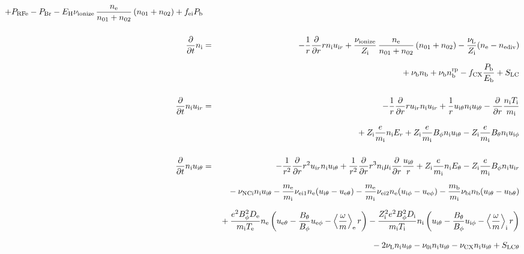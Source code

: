\documentclass[11pt]{article}
\def\r#1{{\rm#1}}
\def\ddt{\frac{\partial}{\partial t}}
\def\ddr{\frac{\partial}{\partial r}}
\def\ave#1{\left\langle#1\right\rangle}
\def\me{m_\r{e}}
\def\mi{m_\r{i}}
\def\mb{m_\r{b}}
\def\mue{\mu_\r{e}}
\def\mui{\mu_\r{i}}
\def\De{D_\r{e}}
\def\Di{D_\r{i}}
\def\ne{n_\r{e}}
\def\ni{n_\r{i}}
\def\nb{n_\r{b}}
\def\uir{u_{\r{i}r}}
\def\ueth{u_{\r{e}\theta}}
\def\uith{u_{\r{i}\theta}}
\def\ubth{u_{\r{b}\theta}}
\def\ueph{u_{\r{e}\phi}}
\def\uiph{u_{\r{i}\phi}}
\def\Er{E_r}
\def\Eth{E_\theta}
\def\Bth{B_\theta}
\def\Bph{B_\phi}
\def\Te{T_\r{e}}
\def\Ti{T_\r{i}}
\def\nna{n_{01}}
\def\nnb{n_{02}}
\def\Zi{Z_\r{i}}
\def\Pb{P_\r{b}}
\def\Eb{E_\r{b}}
\def\PRFe{P_\r{RFe}}
\def\PBr{P_\r{Br}}
\def\EH{E_\r{H}}
\def\fei{f_\r{ei}}
\def\nbrp{n_\r{b}^\r{rp}}
\def\fCX{f_\r{CX}}
\def\nuNCi{\nu_\r{NCi}}
\def\nubi{\nu_\r{bi}}
\def\nuni{\nu_\r{0i}}
\def\nuL{\nu_\r{L}}
\def\nuCX{\nu_\r{CX}}
\def\nuion{\nu_\r{ionize}}
\def\nub{\nu_\r{b}}
\def\nediv{n_\r{ediv}}
\newcommand{\Frac}[2]{%
  {\displaystyle {\displaystyle #1\over \displaystyle #2}}%
}
\newcommand{\rdprd}[2]{\Frac{\partial #1}{\partial #2}}
\newcommand{\aveaveB}[1]{\left< \!\! \left< #1 \right> \!\! \right>}
\begin{document}
\begin{eqnarray}
%
  + \PRFe
%
  - \PBr
%
  - \EH \nuion\, \frac{\ne}{\nna+\nnb}\, (\nna+\nnb)
%
  + \fei \Pb
\\[5mm]
%
%
  \ddt\ni &=&
%
  - \frac{1}{r} \ddr r \ni \uir
%
  + \frac{\nuion}{\Zi}\, \frac{\ne}{\nna+\nnb}\, (\nna+\nnb)
%
  - \frac{\nuL}{\Zi} (\ne - \nediv) 
\nonumber\\[2.5mm]&&{}
%
  + \nub \nb
%
  + \nub \nbrp
%
  - \fCX \frac{\Pb}{\Eb}
%
  + S_\r{LC}
\\[5mm]
%
%
  \ddt \ni \uir &=&
%
  - \frac{1}{r} \ddr r \uir \ni \uir
%
  + \frac{1}{r} \uith \ni \uith
%
  - \ddr \frac{\ni \Ti}{\mi}
\nonumber\\[3mm]&&{}
%
  + \Zi \frac{e}{\mi}\ni \Er
%
  + \Zi \frac{e}{\mi} \Bph \ni \uith
%
  - \Zi \frac{e}{\mi} \Bth \ni \uiph
\\[5mm]
%
%
  \ddt \ni \uith &=&
%
  - \frac{1}{r^2} \ddr r^2 \uir \ni \uith
%
  + \frac{1}{r^2} \ddr r^3 \ni \mui \ddr \frac{\uith}{r}
%
  + \Zi \frac{e}{\mi} \ni \Eth
%
  - \Zi \frac{e}{\mi} \Bph \ni \uir
\nonumber\\[2.5mm]&&{}
%
  - \nuNCi \ni \uith
%
  - \frac{\me}{\mi} \nu_\r{ei1} \ne (\uith - \ueth)
%
  - \frac{\me}{\mi} \nu_\r{ei2} \ne (\uiph - \ueph)
%
  - \frac{\mb}{\mi} \nubi \nb (\uith - \ubth)
\nonumber\\[2.5mm]&&{}
%
  + \frac{e^2 \Bph^2 \De}{\mi\Te}\ne
    \left(\ueth - \frac{\Bth}{\Bph}\ueph - \ave{\frac{\omega}{m}}_\r{e}
     r \right)
%
  - \frac{\Zi^2 e^2 \Bph^2 \Di}{\mi\Ti}\ni
    \left(\uith - \frac{\Bth}{\Bph}\uiph - \ave{\frac{\omega}{m}}_\r{i}
     r \right)
%
\nonumber\\[2.5mm]&&{}
%
  - 2 \nuL \ni \uith
%
  - \nuni \ni \uith
%
  - \nuCX \ni \uith
%
  + S_\r{LC\theta}

\end{eqnarray}
\end{document}
